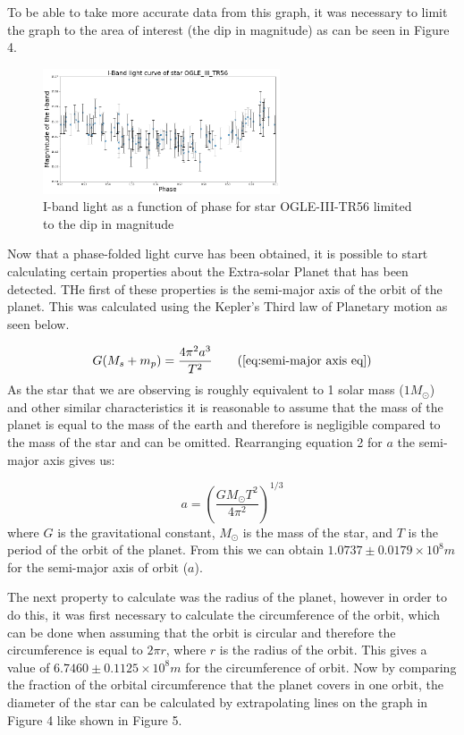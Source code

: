 \documentclass[]{article}
\begin{document}
To be able to take more accurate data from this graph, it
was necessary to limit the graph to the area of interest 
(the dip in magnitude) as can be seen in Figure 4.

\begin{figure}[h]
  \includegraphics[width=7cm]{images/I-band_limit.png}
  \caption{I-band light as a function of phase for star OGLE-III-TR56
  limited to the dip in magnitude}
  \label{fig:HD-_init}
  \end{figure}

Now that a phase-folded light curve has been obtained,
it is possible to start calculating certain properties
about the Extra-solar Planet that has been detected.
THe first of these properties is the semi-major axis
of the orbit of the planet. This was calculated using the 
Kepler's Third law of Planetary motion as seen below.

\begin{equation}
  G(M_s+m_p) = \frac{4\pi^2a^3}{T^2} \tag{\ref{eq:semi-major axis eq}}
  \end{equation}
As the star that we are observing is roughly equivalent to 1 
solar mass ($1M_\odot $) and other similar characteristics it is reasonable 
to assume that the mass of the planet is equal to 
the mass of the earth and therefore is negligible compared to 
the mass of the star and can be omitted. 
Rearranging equation 2 for $a$ the semi-major axis
gives us:

\begin{equation}
  a = \left(\frac{GM_{\odot}T^2}{4\pi^2}\right)^{1/3}
  \end{equation}
where $G$ is the gravitational constant, $M_\odot$ is the mass of the star,
and $T$ is the period of the orbit of the planet.
From this we can obtain \newline$1.0737\pm0.0179\times10^{8}m $
for the semi-major axis of orbit ($a$).
\par
The next property to calculate was the radius of the planet,
however in order to do this, it was first necessary to calculate 
the circumference of the orbit, which can be done when assuming 
that the orbit is circular and therefore the circumference is 
equal to $2\pi r $, where $r$ is the radius of the orbit.
This gives a value of $6.7460\pm0.1125 \times10^{8}m $
for the circumference of orbit. Now by comparing the fraction 
of the orbital circumference that the planet covers in one orbit, 
the diameter of the star can be calculated by extrapolating 
lines on the graph in Figure 4 like shown in Figure 5. 
\end{document}
